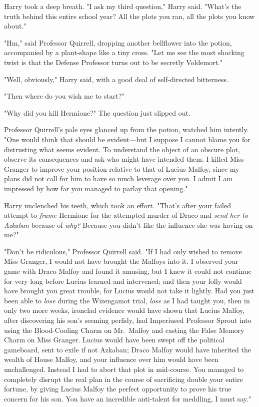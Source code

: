 Harry took a deep breath. "I ask my third question," Harry said. "What's the
truth behind this entire school year? All the plots you ran, all the plots you
know about."

"Hm," said Professor Quirrell, dropping another bellflower into the potion,
accompanied by a plant-shape like a tiny cross. "Let me see{\el} the most
shocking twist is that the Defense Professor turns out to be secretly
Voldemort."

"Well, obviously," Harry said, with a good deal of self-directed bitterness.

"Then where do you wish me to start?"

"Why did you kill Hermione?" The question just slipped out.

Professor Quirrell's pale eyes glanced up from the potion, watched him
intently. "One would think that should be evident---but I suppose I cannot
blame you for distrusting what seems evident. To understand the object of an
obscure plot, observe its consequences and ask who might have intended them. I
killed Miss Granger to improve your position relative to that of Lucius Malfoy,
since my plans did not call for him to have so much leverage over you. I admit
I am impressed by how far you managed to parlay that opening."

Harry unclenched his teeth, which took an effort. "That's after your failed
attempt to \emph{frame} Hermione for the attempted murder of Draco and
\emph{send her to Azkaban} because of \emph{why?} Because you didn't like the
influence she was having on me?"

"Don't be ridiculous," Professor Quirrell said. "If I had only wished to remove
Miss Granger, I would not have brought the Malfoys into it. I observed your
game with Draco Malfoy and found it amusing, but I knew it could not continue
for very long before Lucius learned and intervened; and then your folly would
have brought you great trouble, for Lucius would not take it lightly. Had you
just been able to \emph{lose} during the Wizengamot trial, \emph{lose} as I had
taught you, then in only two more weeks, ironclad evidence would have shown
that Lucius Malfoy, after discovering his son's seeming perfidy, had Imperiused
Professor Sprout into using the Blood-Cooling Charm on Mr.~Malfoy and casting
the False Memory Charm on Miss Granger. Lucius would have been swept off the
political gameboard, sent to exile if not Azkaban; Draco Malfoy would have
inherited the wealth of House Malfoy, and your influence over him would have
been unchallenged. Instead I had to abort that plot in mid-course. You managed
to completely disrupt the real plan in the course of sacrificing double your
entire fortune, by giving Lucius Malfoy the perfect opportunity to prove his
true concern for his son. You have an incredible anti-talent for meddling, I
must say."

